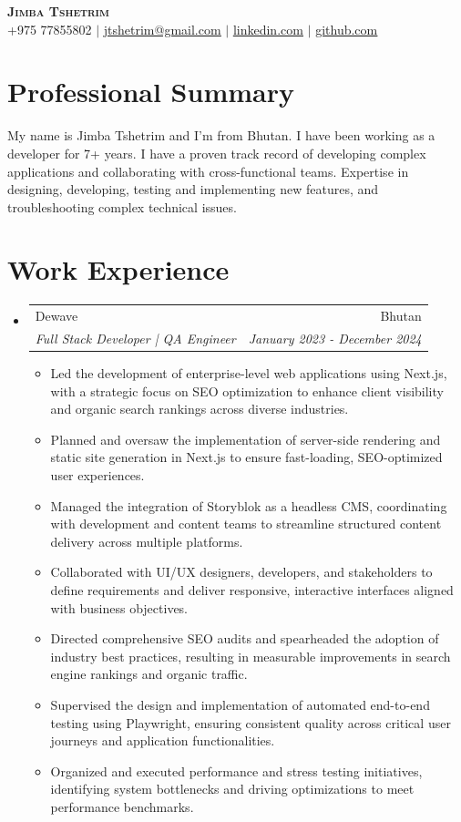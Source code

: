 \documentclass[letterpaper,11pt]{article}
\makeatletter
\newcommand{\resumeItem}[1]{
  \item\small{
    {#1 \vspace{-2pt}}
  }
}
\newcommand{\resumeSubheading}[4]{
  \vspace{-2pt}\item
    \begin{tabular*}{0.97\textwidth}[t]{l@{\extracolsep{\fill}}r}
      {#1} & #2 \\
      \textit{\small#3} & \textit{\small #4} \\
    \end{tabular*}\vspace{-7pt}
}
\newcommand{\resumeSubHeadingListStart}{\begin{itemize}[leftmargin=0.15in, label={}]}
\newcommand{\resumeSubHeadingListEnd}{\end{itemize}}
\newcommand{\resumeItemListStart}{\begin{itemize}}
\newcommand{\resumeItemListEnd}{\end{itemize}\vspace{-5pt}}
\makeatother
\begin{document}

\begin{center}
    \textbf{\Huge \scshape Jimba Tshetrim} \\ \vspace{1pt}
    \small +975 77855802 $|$ \href{mailto:jtshetrim@gmail.com}{\underline{jtshetrim@gmail.com}} $|$  
    \href{https://linkedin.com/in/jimba-tshetrim}{\underline{linkedin.com}} $|$
    \href{https://github.com/jimbatshetrim}{\underline{github.com}}
    \end{center}

\section{Professional Summary}
\small{
    My name is Jimba Tshetrim and I’m from Bhutan. I have been working as a developer for 7+ years. I have a
proven track record of developing complex applications and collaborating with cross-functional teams. Expertise
in designing, developing, testing and implementing new features, and troubleshooting complex technical issues.
}

\section{Work Experience}
  \resumeSubHeadingListStart
      \resumeSubheading
      {Dewave}{Bhutan}
      {Full Stack Developer | QA Engineer}{January 2023 - December 2024}
      \resumeItemListStart
        \resumeItem{Led the development of enterprise-level web applications using Next.js, with a strategic focus on SEO optimization to enhance client visibility and organic search rankings across diverse industries.}
        \resumeItem{Planned and oversaw the implementation of server-side rendering and static site generation in Next.js to ensure fast-loading, SEO-optimized user experiences.}
        \resumeItem{Managed the integration of Storyblok as a headless CMS, coordinating with development and content teams to streamline structured content delivery across multiple platforms.}
        \resumeItem{Collaborated with UI/UX designers, developers, and stakeholders to define requirements and deliver responsive, interactive interfaces aligned with business objectives.}
        \resumeItem{Directed comprehensive SEO audits and spearheaded the adoption of industry best practices, resulting in measurable improvements in search engine rankings and organic traffic.}
        \resumeItem{Supervised the design and implementation of automated end-to-end testing using Playwright, ensuring consistent quality across critical user journeys and application functionalities.}
        \resumeItem{Organized and executed performance and stress testing initiatives, identifying system bottlenecks and driving optimizations to meet performance benchmarks.}
     \resumeItemListEnd
  \resumeSubHeadingListEnd
\end{document}
